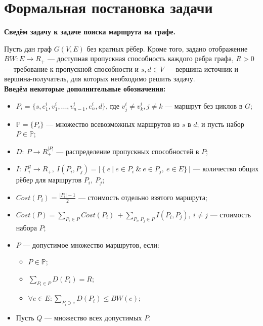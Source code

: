 \documentclass[a4paper]{article}
\begin{document}
\bigskip
\section{Формальная постановка задачи}
\textbf{Сведём задачу к задаче поиска маршрута на графе.} 

Пусть дан граф $G(V, E)$ без кратных рёбер. Кроме того, задано отображение $BW: E \to R_+$ --- доступная пропускная способность каждого ребра графа, $R>0$ --- требование к пропускной способности и $s, d \in V$ --- вершина-источник и вершина-получатель, для которых необходимо решить задачу.\\
\textbf{Введём некоторые дополнительные обозначения:}
\begin{itemize}

\item $P_i = \{s, e^i_1, v^i_1, ..., v^i_{n-1}, e^i_n, d\}$, где $v^i_j \ne v^i_k, j \ne k$ --- маршрут без циклов в $G$;

\item $\mathbb{P} = \{P_i\}$ --- множество всевозможных маршрутов из $s$ в $d$; и пусть набор $P \in \mathbb{P}$;

\item $D:\  P \to R^{|P|}_+$ --- распределение пропускных способностей в $P$;

\item $I:\  P^2_i \to R_+, \ I(P_i, P_j) = |\ \{\ e\ |\ e \in P_i \ \& \ e \in P_j, \ e \in E\}\ |$ --- количество общих рёбер для маршрутов $P_i,\ P_j$;

\item $Cost(P_i) = \frac{|P_i| - 1}{2}$ --- стоимость отдельно взятого маршрута;

\item $Cost(P) = \sum\limits_{P_i\in P} Cost(P_i)\ + \sum\limits_{P_i, P_j \in P} I(P_i, P_j),\ i \ne j$ --- стоимость набора $P$;

\item $P$ --- допустимое множество маршрутов, если:
\begin{itemize}
\item $P\in \mathbb{P}$;
\item $\sum\limits_{P_i\in P} D(P_i) = R$;
\item $\forall e \in E: \sum\limits_{P_i \ni e} D(P_i) \le BW(e)$;
\end{itemize}
\item Пусть $Q$ --- множество всех допустимых $P$.
\end{itemize}
\end{document}
